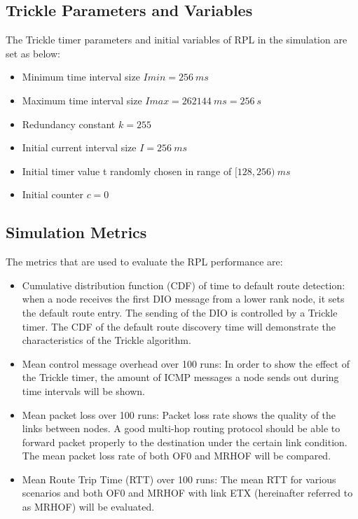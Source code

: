 \subsection{Trickle Parameters and Variables}
\label{trickle parameters}
The Trickle timer parameters and initial variables of RPL in the simulation are set as below:
\begin{itemize}
\item Minimum time interval size $Imin = 256\:ms$

\item Maximum time interval size $Imax = 262144\:ms = 256\:s$

\item Redundancy constant $k = 255$

\item Initial current interval size $I = 256\:ms$

\item Initial timer value t randomly chosen in range of $[128, 256)\:ms$

\item Initial counter $c=0$
\end{itemize}

\subsection{Simulation Metrics}
\label{Sim:metrics}
The metrics that are used to evaluate the RPL performance are:
\begin{itemize}
\item Cumulative distribution function (CDF) of time to default route detection: when a node receives the first DIO message from a lower rank node, it sets the default route entry. The sending of the DIO is controlled by a Trickle timer. The CDF of the default route discovery time will demonstrate the characteristics of the Trickle algorithm.

\item Mean control message overhead over 100 runs: In order to show the effect of the Trickle timer, the amount of ICMP messages a node sends out during time intervals will be shown.

\item Mean packet loss over 100 runs: Packet loss rate shows the quality of the links between nodes. A good multi-hop routing protocol should be able to forward packet properly to the destination under the certain link condition. The mean packet loss rate of both OF0 and MRHOF will be compared.

\item Mean Route Trip Time (RTT) over 100 runs: The mean RTT for various scenarios and both OF0 and MRHOF with link ETX (hereinafter referred to as MRHOF) will be evaluated.

\end{itemize}








